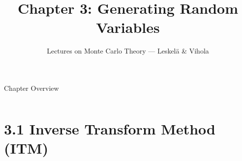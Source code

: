 \documentclass[aspectratio=169,10pt]{beamer}
\title[Ch.\,3: Generating Random Variables]{%
  Chapter 3: Generating Random Variables}
\subtitle{Lectures on Monte Carlo Theory --- Leskel\"a \& Vihola}
\author{}
\date{}
\begin{document}
\begin{frame}
  \titlepage
\end{frame}

\begin{frame}{Chapter Overview}
  \begin{columns}[t]
    \tableofcontents[sections={1-5}]
    \tableofcontents[sections={6-11}]
  \end{columns}
\end{frame}


\section{3.1 Inverse Transform Method (ITM)}
\end{document}
